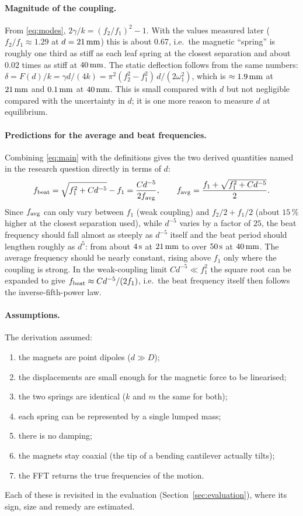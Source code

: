 \paragraph{Magnitude of the coupling.} From \eqref{eq:modes}, $2\gamma/k=(f_2/f_1)^2-1$. With the values measured later ($f_2/f_1\approx1.29$ at $d=21\,\mathrm{mm}$) this is about $0.67$, i.e.\ the magnetic ``spring'' is roughly one third as stiff as each leaf spring at the closest separation and about $0.02$ times as stiff at $40\,\mathrm{mm}$. The static deflection follows from the same numbers: $\delta=F(d)/k=\gamma d/(4k)=\pi^2 (f_2^2-f_1^2)\,d/(2\omega_1^2)$, which is $\approx1.9\,\mathrm{mm}$ at $21\,\mathrm{mm}$ and $0.1\,\mathrm{mm}$ at $40\,\mathrm{mm}$. This is small compared with $d$ but not negligible compared with the uncertainty in $d$; it is one more reason to measure $d$ at equilibrium.

\paragraph{Predictions for the average and beat frequencies.} Combining \eqref{eq:main} with the definitions gives the two derived quantities named in the research question directly in terms of $d$:
\begin{equation}
f_{\rm beat}=\sqrt{f_1^2+Cd^{-5}}-f_1=\frac{Cd^{-5}}{2f_{\rm avg}},\qquad
f_{\rm avg}=\frac{f_1+\sqrt{f_1^2+Cd^{-5}}}{2}.
\label{eq:favg_fbeat}
\end{equation}
Since $f_{\rm avg}$ can only vary between $f_1$ (weak coupling) and $f_2/2+f_1/2$ (about $15\,\%$ higher at the closest separation used), while $d^{-5}$ varies by a factor of $25$, the beat frequency should fall almost as steeply as $d^{-5}$ itself and the beat period should lengthen roughly as $d^{5}$: from about $4\,\mathrm{s}$ at $21\,\mathrm{mm}$ to over $50\,\mathrm{s}$ at $40\,\mathrm{mm}$. The average frequency should be nearly constant, rising above $f_1$ only where the coupling is strong. In the weak-coupling limit $Cd^{-5}\ll f_1^2$ the square root can be expanded to give $f_{\rm beat}\approx Cd^{-5}/(2f_1)$, i.e.\ the beat frequency itself then follows the inverse-fifth-power law.

\paragraph{Assumptions.} The derivation assumed:
\begin{enumerate}[label=(\alph*)]
\item the magnets are point dipoles ($d\gg D$);
\item the displacements are small enough for the magnetic force to be linearised;
\item the two springs are identical ($k$ and $m$ the same for both);
\item each spring can be represented by a single lumped mass;
\item there is no damping;
\item the magnets stay coaxial (the tip of a bending cantilever actually tilts);
\item the FFT returns the true frequencies of the motion.
\end{enumerate}
Each of these is revisited in the evaluation (Section~\ref{sec:evaluation}), where its sign, size and remedy are estimated.

